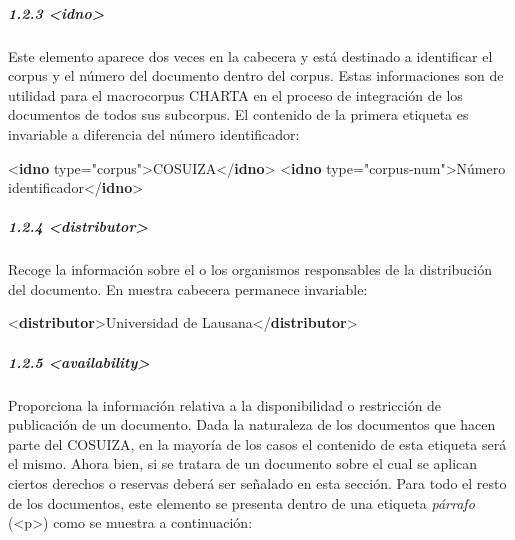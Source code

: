 \documentclass[
]{book}
\newenvironment{Shaded}{\begin{snugshade}}{\end{snugshade}}
\newcommand{\KeywordTok}[1]{\textcolor[rgb]{0.13,0.29,0.53}{\textbf{#1}}}
\newcommand{\NormalTok}[1]{#1}
\newcommand{\OtherTok}[1]{\textcolor[rgb]{0.56,0.35,0.01}{#1}}
\newcommand{\StringTok}[1]{\textcolor[rgb]{0.31,0.60,0.02}{#1}}
\begin{document}
\hypertarget{idno}{%
\subparagraph*{\texorpdfstring{1.2.3 { \textless idno\textgreater{} }}{1.2.3  \textless idno\textgreater{} }}\label{idno}}

Este elemento aparece dos veces en la cabecera y está destinado a identificar el corpus y el número del documento dentro del corpus. Estas informaciones son de utilidad para el macrocorpus CHARTA en el proceso de integración de los documentos de todos sus subcorpus. El contenido de la primera etiqueta es invariable a diferencia del número identificador:

\begin{Shaded}
\begin{Highlighting}[]
\NormalTok{\textless{}}\KeywordTok{idno}\OtherTok{ type=}\StringTok{"corpus"}\NormalTok{\textgreater{}COSUIZA\textless{}/}\KeywordTok{idno}\NormalTok{\textgreater{}}
\NormalTok{\textless{}}\KeywordTok{idno}\OtherTok{ type=}\StringTok{"corpus{-}num"}\NormalTok{\textgreater{}Número identificador\textless{}/}\KeywordTok{idno}\NormalTok{\textgreater{}}
\end{Highlighting}
\end{Shaded}

\hypertarget{distributor}{%
\subparagraph*{\texorpdfstring{1.2.4 { \textless distributor\textgreater{} }}{1.2.4  \textless distributor\textgreater{} }}\label{distributor}}

Recoge la información sobre el o los organismos responsables de la distribución del documento. En nuestra cabecera permanece invariable:

\begin{Shaded}
\begin{Highlighting}[]
\NormalTok{\textless{}}\KeywordTok{distributor}\NormalTok{\textgreater{}Universidad de Lausana\textless{}/}\KeywordTok{distributor}\NormalTok{\textgreater{}}
\end{Highlighting}
\end{Shaded}

\hypertarget{availability}{%
\subparagraph*{\texorpdfstring{1.2.5 { \textless availability\textgreater{} }}{1.2.5  \textless availability\textgreater{} }}\label{availability}}

Proporciona la información relativa a la disponibilidad o restricción de publicación de un documento. Dada la naturaleza de los documentos que hacen parte del COSUIZA, en la mayoría de los casos el contenido de esta etiqueta será el mismo. Ahora bien, si se tratara de un documento sobre el cual se aplican ciertos derechos o reservas deberá ser señalado en esta sección. Para todo el resto de los documentos, este elemento se presenta dentro de una etiqueta \emph{párrafo} ({\textless p\textgreater{}}) como se muestra a continuación:
\end{document}
